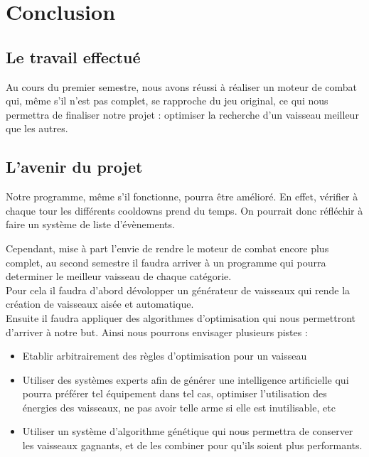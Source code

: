 \chapter{Conclusion}

	\section{Le travail effectué}
		Au cours du premier semestre, nous avons réussi à réaliser un moteur de combat qui, même s'il n'est pas complet, se rapproche du jeu original, ce qui nous permettra de finaliser notre projet : optimiser la recherche d'un vaisseau meilleur que les autres.
			
			\section{L'avenir du projet}
		Notre programme, même s'il fonctionne, pourra être amélioré. En effet, vérifier à chaque tour les différents cooldowns prend du temps. On pourrait donc réfléchir à faire un système de liste d'évènements.

		Cependant, mise à part l'envie de rendre le moteur de combat encore plus complet, au second semestre il faudra arriver à un programme qui pourra determiner le meilleur vaisseau de chaque catégorie.\\
		Pour cela il faudra d'abord dévolopper un générateur de vaisseaux qui rende la création de vaisseaux aisée et automatique.\\
		Ensuite il faudra appliquer des algorithmes d'optimisation qui nous permettront d'arriver à notre but. Ainsi nous pourrons envisager plusieurs pistes :
		
		\begin{itemize}
			\item Etablir arbitrairement des règles d'optimisation pour un vaisseau		
			\item Utiliser des systèmes experts afin de générer une intelligence artificielle qui pourra préférer tel équipement dans tel cas, optimiser l'utilisation des énergies des vaisseaux, ne pas avoir telle arme si elle est inutilisable, etc
			\item Utiliser un système d'algorithme génétique qui nous permettra de conserver les vaisseaux gagnants, et de les combiner pour qu'ils soient plus performants.
		\end{itemize}
